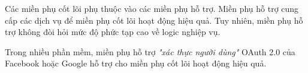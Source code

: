  Các miền phụ cốt lõi phụ thuộc vào các miền phụ hỗ trợ.         Miền phụ hỗ trợ cung cấp các dịch vụ để miền phụ cốt lõi hoạt động hiệu quả.     Tuy nhiên, miền phụ hỗ trợ không đòi hỏi mức độ phức tạp cao về logic nghiệp vụ.

\begin{example} Trong nhiều phần mềm, miền phụ hỗ trợ \textit{"xác thực người dùng"} OAuth 2.0 của Facebook hoặc Google hỗ trợ cho miền phụ cốt lõi hoạt động hiệu quả.

\end{example} 